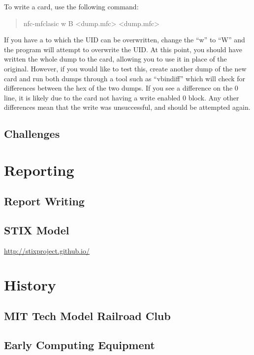 \documentclass[a4paper,11pt]{report}
\begin{document}
			To write a card, use the following command:
			\begin{quote}
				nfc-mfclasic w B <dump.mfc> <dump.mfc> 
			\end{quote}
			If you have a to which the UID can be overwritten, change the ``w'' to ``W'' and the program will attempt to overwrite the UID. 
			At this point, you should have written the whole dump to the card, allowing you to use it in place of the original. 
			However, if you would like to test this, create another dump of the new card and run both dumps through a tool such as ``vbindiff'' which will check for differences between the hex of the two dumps. 
			If you see a difference on the 0 line, it is likely due to the card not having a write enabled 0 block. 
			Any other differences mean that the write was unsuccessful, and should be attempted again. 
	\section{Challenges}
\chapter{Reporting}
	\label{ch:Reporting}
	\section{Report Writing}
	\section{STIX Model}
		\url{http://stixproject.github.io/}
\newpage
\chapter{History}
	\label{ch:History}
	\section{MIT Tech Model Railroad Club}
	\section{Early Computing Equipment}
\appendix
	\label{ch:Appendix}
	\listoftables
	\listoffigures
	 \renewcommand{\figurename}{Code Example}
	 	
	
	
\end{document}
